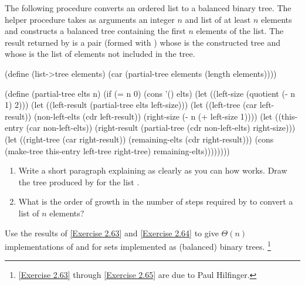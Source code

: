 \begin{exercise}
	\label{Exercise 2.64}
	The following procedure  converts an ordered list to a balanced binary tree.
	The helper procedure  takes as arguments an integer \( n \) and list of at least \( n \) elements and constructs a balanced tree containing the first \( n \) elements of the list.
	The result returned by  is a pair (formed with ) whose  is the constructed tree and whose  is the list of elements not included in the tree.
	\begin{scheme}
	  (define (list->tree elements)
	    (car (partial-tree elements (length elements))))

	  (define (partial-tree elts n)
	    (if (= n 0)
	        (cons '() elts)
	        (let ((left-size (quotient (- n 1) 2)))
	          (let ((left-result
	                 (partial-tree elts left-size)))
	            (let ((left-tree (car left-result))
	                  (non-left-elts (cdr left-result))
	                  (right-size (- n (+ left-size 1))))
	              (let ((this-entry (car non-left-elts))
	                    (right-result
	                     (partial-tree
	                      (cdr non-left-elts)
	                      right-size)))
	                (let ((right-tree (car right-result))
	                      (remaining-elts
	                       (cdr right-result)))
	                  (cons (make-tree this-entry
	                                   left-tree
	                                   right-tree)
	                        remaining-elts))))))))
	\end{scheme}
	\begin{enumerate}[label = \alph*., leftmargin = *]

		\item
			Write a short paragraph explaining as clearly as you can how  works.
			Draw the tree produced by  for the list .

		\item
			What is the order of growth in the number of steps required by  to convert a list of \( n \) elements?

	\end{enumerate}
\end{exercise}



\begin{exercise}
	\label{Exercise 2.65}
	Use the results of \cref{Exercise 2.63} and \cref{Exercise 2.64} to give \( Θ(n) \) implementations of  and  for sets implemented as (balanced) binary trees.%
	\footnote{
		\cref{Exercise 2.63} through \cref{Exercise 2.65} are due to Paul Hilfinger.
	}
\end{exercise}



